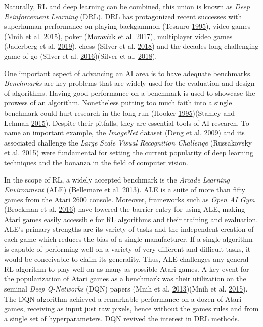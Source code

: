 \documentclass[
  12pt,
  openany]{book}
\begin{document}
Naturally, RL and deep learning can be combined, this union is known as \emph{Deep Reinforcement Learning} (DRL). DRL has protagonized recent successes with superhuman performance on playing backgammon (Tesauro \protect\hyperlink{ref-tesauro1995temporal}{1995}), video games (Mnih et al. \protect\hyperlink{ref-mnih2015human}{2015}), poker (Moravčík et al. \protect\hyperlink{ref-moravvcik2017deepstack}{2017}), multiplayer video games (Jaderberg et al. \protect\hyperlink{ref-jaderberg2019human}{2019}), chess (Silver et al. \protect\hyperlink{ref-silver2018general}{2018}) and the decades-long challenging game of go (Silver et al. \protect\hyperlink{ref-silver2016mastering}{2016})(Silver et al. \protect\hyperlink{ref-silver2018general}{2018}).

One important aspect of advancing an AI area is to have adequate benchmarks. \emph{Benchmarks} are key problems that are widely used for the evaluation and design of algorithms. Having good performance on a benchmark is used to showcase the prowess of an algorithm. Nonetheless putting too much faith into a single benchmark could hurt research in the long run (Hooker \protect\hyperlink{ref-hooker1995testing}{1995})(Stanley and Lehman \protect\hyperlink{ref-stanley2015greatness}{2015}). Despite their pitfalls, they are essential tools of AI research. To name an important example, the \emph{ImageNet} dataset (Deng et al. \protect\hyperlink{ref-deng2009imagenet}{2009}) and its associated challenge the \emph{Large Scale Visual Recognition Challenge} (Russakovsky et al. \protect\hyperlink{ref-russakovsky2015imagenet}{2015}) were fundamental for setting the current popularity of deep learning techniques and the bonanza in the field of computer vision.

In the scope of RL, a widely accepted benchmark is the \emph{Arcade Learning Environment} (ALE) (Bellemare et al. \protect\hyperlink{ref-bellemare2013arcade}{2013}). ALE is a suite of more than fifty games from the Atari 2600 console. Moreover, frameworks such as \emph{Open AI Gym} (Brockman et al. \protect\hyperlink{ref-1606.01540}{2016}) have lowered the barrier entry for using ALE, making Atari games easily accessible for RL algorithms and their training and evaluation. ALE's primary strengths are its variety of tasks and the independent creation of each game which reduces the bias of a single manufacturer. If a single algorithm is capable of performing well on a variety of very different and difficult tasks, it would be conceivable to claim its generality. Thus, ALE challenges any general RL algorithm to play well on as many as possible Atari games. A key event for the popularization of Atari games as a benchmark was their utilization on the seminal \emph{Deep Q-Networks} (DQN) papers (Mnih et al. \protect\hyperlink{ref-mnih2013playing}{2013})(Mnih et al. \protect\hyperlink{ref-mnih2015human}{2015}). The DQN algorithm achieved a remarkable performance on a dozen of Atari games, receiving as input just raw pixels, hence without the games rules and from a single set of hyperparameters. DQN revived the interest in DRL methods.
\end{document}
